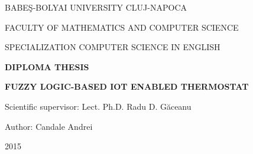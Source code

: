 \documentclass[a4paper, 12pt, english]{report}
\begin{document}
\begin{titlepage}
\sloppy
\begin{center}
\Large{BABE\c{S}-BOLYAI UNIVERSITY CLUJ-NAPOCA}

\Large{FACULTY OF MATHEMATICS AND COMPUTER SCIENCE}

\Large{SPECIALIZATION COMPUTER SCIENCE IN ENGLISH}



\vspace{7cm}
\Large \textbf{DIPLOMA THESIS}

\vspace{1.3cm}
\Huge \textbf{FUZZY LOGIC-BASED IOT ENABLED THERMOSTAT}

\end{center}
\vspace{4cm}

\begin{flushleft}
    \Large{Scientific supervisor: Lect. Ph.D. Radu D. G\u{a}ceanu}
\end{flushleft}

\vspace{1cm}

\begin{flushright}
    \Large{Author: Candale Andrei}
\end{flushright}

\vspace{1cm}

\begin{center}
\Large{2015}
\end{center}

\end{titlepage}
\end{document}
